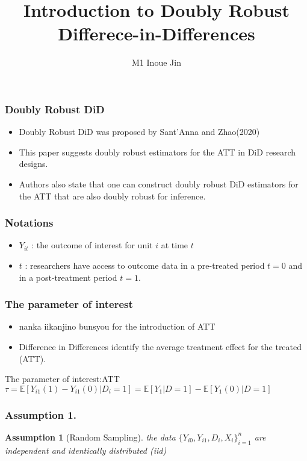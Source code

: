 \documentclass{beamer}
\title{Introduction to Doubly Robust Differece-in-Differences}
\author{M1 Inoue Jin}
\institute{Hitotsubashi University}
\newtheorem{assumption}[thm]{Assumption}
\begin{document}
\begin{frame}
    \titlepage
\end{frame}

\begin{frame}\frametitle{Doubly Robust DiD}
    \begin{itemize}
        \item Doubly Robust DiD was proposed by Sant'Anna and Zhao(2020)
        \item This paper suggests doubly robust estimators for the ATT in DiD research designs.
        \item Authors also state that one can construct doubly robust DiD estimators for the ATT that are also doubly robust for inference.
    \end{itemize}
\end{frame}

\begin{frame}\frametitle{Notations}
    \begin{itemize}
        \item $Y_{it}$ : the outcome of interest for unit $i$ at time $t$
        \item $t$ : researchers have access to outcome data in a pre-treated period $t = 0$ and in a post-treatment period $t = 1$.
    \end{itemize}
\end{frame}

\begin{frame}\frametitle{The parameter of interest}
    \begin{itemize}
        \item nanka iikanjino bunsyou for the introduction of ATT
        \item Difference in Differences identify the average treatment effect for the treated (ATT). 
    \end{itemize}
    \begin{block}{The parameter of interest:ATT}
        $\tau = \mathbb{E}[Y_{i1}(1) - Y_{i1}(0)| D_{i} = 1] = \mathbb{E}[Y_{1} |D = 1] - \mathbb{E}[Y_{1}(0) | D = 1]$
    \end{block}
\end{frame}

\begin{frame}\frametitle{Assumption 1.}
    \begin{assumption}[Random Sampling]
        the data $\{Y_{i0}, Y_{i1}, D_{i}, X_{i}\}^{n}_{i = 1}$ are independent and identically distributed (iid)
    \end{assumption}
\end{frame}
\end{document}
